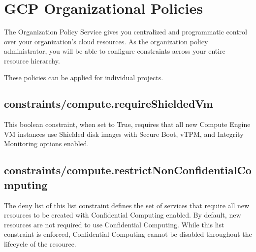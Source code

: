 
\section{GCP Organizational Policies}


The Organization Policy Service gives you 
centralized and programmatic control over your organization's cloud resources. 
As the organization policy administrator, 
you will be able to configure constraints across your entire resource hierarchy. 

These policies can be applied for individual projects.

\subsection{constraints/compute.requireShieldedVm}
This boolean constraint, when set to True, 
requires that all new Compute Engine VM instances use Shielded disk images 
with Secure Boot, vTPM, and Integrity Monitoring options enabled.

\subsection{constraints/compute.restrictNonConfidentialComputing}
The deny list of this list constraint defines the set of services 
that require all new resources to be created with Confidential Computing enabled.
By default, new resources are not required to use Confidential Computing. 
While this list constraint is enforced, 
Confidential Computing cannot be disabled 
throughout the lifecycle of the resource.
